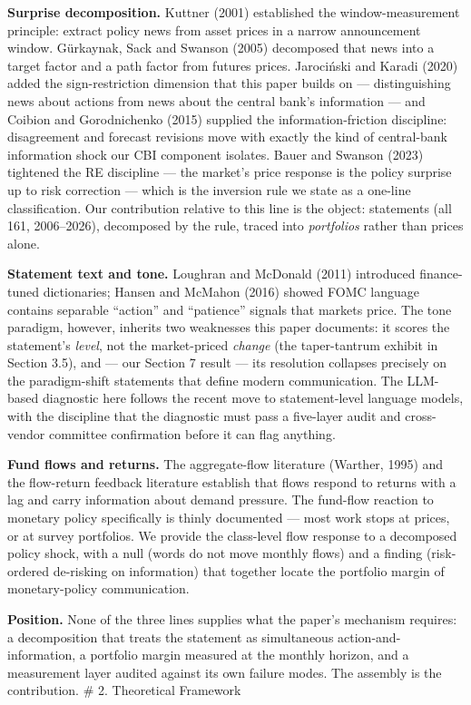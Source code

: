 \textbf{Surprise decomposition.} Kuttner (2001) established the window-measurement principle: extract policy news from asset prices in a narrow announcement window. Gürkaynak, Sack and Swanson (2005) decomposed that news into a target factor and a path factor from futures prices. Jarociński and Karadi (2020) added the sign-restriction dimension that this paper builds on --- distinguishing news about actions from news about the central bank's information --- and Coibion and Gorodnichenko (2015) supplied the information-friction discipline: disagreement and forecast revisions move with exactly the kind of central-bank information shock our CBI component isolates. Bauer and Swanson (2023) tightened the RE discipline --- the market's price response is the policy surprise up to risk correction --- which is the inversion rule we state as a one-line classification. Our contribution relative to this line is the object: statements (all 161, 2006--2026), decomposed by the rule, traced into \emph{portfolios} rather than prices alone.

\textbf{Statement text and tone.} Loughran and McDonald (2011) introduced finance-tuned dictionaries; Hansen and McMahon (2016) showed FOMC language contains separable ``action'' and ``patience'' signals that markets price. The tone paradigm, however, inherits two weaknesses this paper documents: it scores the statement's \emph{level}, not the market-priced \emph{change} (the taper-tantrum exhibit in Section 3.5), and --- our Section 7 result --- its resolution collapses precisely on the paradigm-shift statements that define modern communication. The LLM-based diagnostic here follows the recent move to statement-level language models, with the discipline that the diagnostic must pass a five-layer audit and cross-vendor committee confirmation before it can flag anything.

\textbf{Fund flows and returns.} The aggregate-flow literature (Warther, 1995) and the flow-return feedback literature establish that flows respond to returns with a lag and carry information about demand pressure. The fund-flow reaction to monetary policy specifically is thinly documented --- most work stops at prices, or at survey portfolios. We provide the class-level flow response to a decomposed policy shock, with a null (words do not move monthly flows) and a finding (risk-ordered de-risking on information) that together locate the portfolio margin of monetary-policy communication.

\textbf{Position.} None of the three lines supplies what the paper's mechanism requires: a decomposition that treats the statement as simultaneous action-and-information, a portfolio margin measured at the monthly horizon, and a measurement layer audited against its own failure modes. The assembly is the contribution. \# 2. Theoretical Framework


